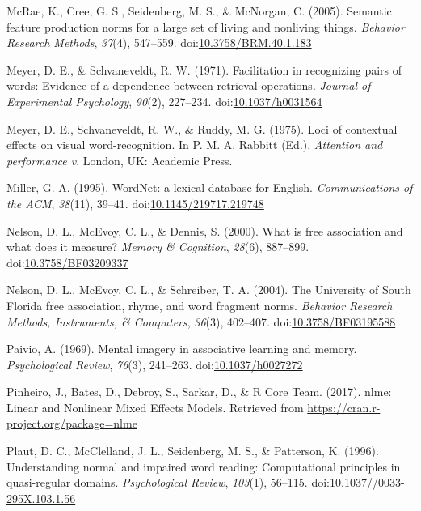 \documentclass[english,man]{apa6}
\theoremstyle{definition}
\theoremstyle{definition}
\theoremstyle{definition}
\theoremstyle{remark}
\begin{document}
\hypertarget{ref-McRae2005}{}
McRae, K., Cree, G. S., Seidenberg, M. S., \& McNorgan, C. (2005).
Semantic feature production norms for a large set of living and
nonliving things. \emph{Behavior Research Methods}, \emph{37}(4),
547--559.
doi:\href{https://doi.org/10.3758/BRM.40.1.183}{10.3758/BRM.40.1.183}

\hypertarget{ref-Meyer1971}{}
Meyer, D. E., \& Schvaneveldt, R. W. (1971). Facilitation in recognizing
pairs of words: Evidence of a dependence between retrieval operations.
\emph{Journal of Experimental Psychology}, \emph{90}(2), 227--234.
doi:\href{https://doi.org/10.1037/h0031564}{10.1037/h0031564}

\hypertarget{ref-Meyer1975}{}
Meyer, D. E., Schvaneveldt, R. W., \& Ruddy, M. G. (1975). Loci of
contextual effects on visual word-recognition. In P. M. A. Rabbitt
(Ed.), \emph{Attention and performance v}. London, UK: Academic Press.

\hypertarget{ref-Miller1995}{}
Miller, G. A. (1995). WordNet: a lexical database for English.
\emph{Communications of the ACM}, \emph{38}(11), 39--41.
doi:\href{https://doi.org/10.1145/219717.219748}{10.1145/219717.219748}

\hypertarget{ref-Nelson2000}{}
Nelson, D. L., McEvoy, C. L., \& Dennis, S. (2000). What is free
association and what does it measure? \emph{Memory \& Cognition},
\emph{28}(6), 887--899.
doi:\href{https://doi.org/10.3758/BF03209337}{10.3758/BF03209337}

\hypertarget{ref-Nelson2004}{}
Nelson, D. L., McEvoy, C. L., \& Schreiber, T. A. (2004). The University
of South Florida free association, rhyme, and word fragment norms.
\emph{Behavior Research Methods, Instruments, \& Computers},
\emph{36}(3), 402--407.
doi:\href{https://doi.org/10.3758/BF03195588}{10.3758/BF03195588}

\hypertarget{ref-Paivio1969}{}
Paivio, A. (1969). Mental imagery in associative learning and memory.
\emph{Psychological Review}, \emph{76}(3), 241--263.
doi:\href{https://doi.org/10.1037/h0027272}{10.1037/h0027272}

\hypertarget{ref-Pinheiro2017}{}
Pinheiro, J., Bates, D., Debroy, S., Sarkar, D., \& R Core Team. (2017).
nlme: Linear and Nonlinear Mixed Effects Models. Retrieved from
\url{https://cran.r-project.org/package=nlme}

\hypertarget{ref-Plaut1996}{}
Plaut, D. C., McClelland, J. L., Seidenberg, M. S., \& Patterson, K.
(1996). Understanding normal and impaired word reading: Computational
principles in quasi-regular domains. \emph{Psychological Review},
\emph{103}(1), 56--115.
doi:\href{https://doi.org/10.1037//0033-295X.103.1.56}{10.1037//0033-295X.103.1.56}
\end{document}
